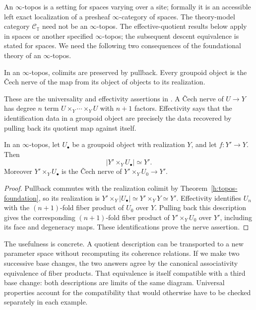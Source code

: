 An $\infty$-topos is a setting for spaces varying over a site; formally it
is an accessible left exact localization of a presheaf $\infty$-category
of spaces.  The theory-model category $\mathcal C_{\mathbb T}$ need not
be an $\infty$-topos.  The effective-quotient results below apply in spaces
or another specified $\infty$-topos; the subsequent descent equivalence
is stated for spaces.  We need the following two consequences of the
foundational theory of an $\infty$-topos.

\begin{theorem}
\label{h:topos-foundation}
In an $\infty$-topos, colimits are preserved by pullback.  Every groupoid
object is the \v{C}ech nerve of the map from its object of objects to its
realization.
\end{theorem}
These are the universality and effectivity assertions in
\cite[Theorem 6.1.0.6]{HTT}.  A \v{C}ech nerve of $U\to Y$ has degree
$n$ term $U\times_Y\cdots\times_Y U$ with $n+1$ factors.  Effectivity
says that the identification data in a groupoid object are precisely the
data recovered by pulling back its quotient map against itself.

\begin{proposition}
\label{h:quotient-basechange}
In an $\infty$-topos, let $U_\bullet$ be a groupoid object with realization $Y$, and let
$f:Y'\to Y$.  Then
\[
 \left|Y'\times_Y U_\bullet\right|\simeq Y'.
\]
Moreover $Y'\times_Y U_\bullet$ is the \v{C}ech nerve of
$Y'\times_Y U_0\to Y'$.
\end{proposition}
\begin{proof}
Pullback commutes with the realization colimit by
Theorem~\ref{h:topos-foundation}, so its realization is
$Y'\times_Y|U_\bullet|\simeq Y'\times_Y Y\simeq Y'$.
Effectivity identifies $U_n$ with the $(n+1)$-fold fiber product of $U_0$
over $Y$.  Pulling back this description gives the corresponding
$(n+1)$-fold fiber product of $Y'\times_Y U_0$ over $Y'$, including its
face and degeneracy maps.  These identifications prove the nerve assertion.
\end{proof}

The usefulness is concrete.  A quotient description can be transported to
a new parameter space without recomputing its coherence relations.  If we
make two successive base changes, the two answers agree by the canonical
associativity equivalence of fiber products.  That equivalence is itself
compatible with a third base change: both descriptions are limits of the
same diagram.  Universal properties account for the compatibility that
would otherwise have to be checked separately in each example.

